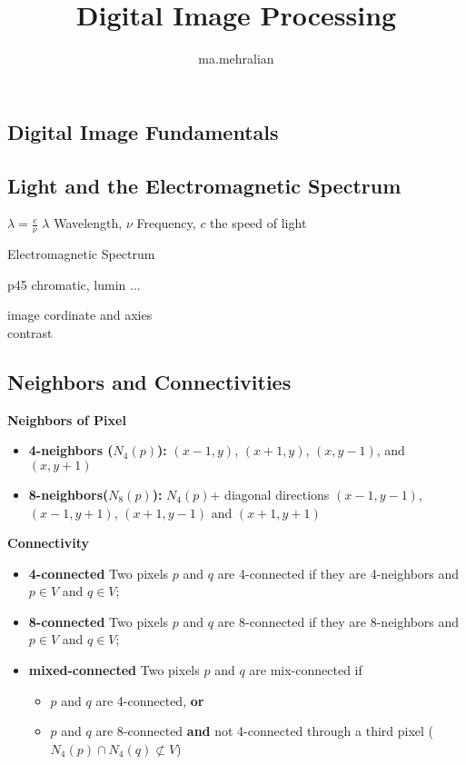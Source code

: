 \documentclass{../cheat}
\title{Digital Image Processing}
\author{ma.mehralian}
\begin{document}
\begin{multicols}{3}
	\section{Digital Image Fundamentals}
	\subsection{Light and the Electromagnetic Spectrum}
	$\lambda=\frac{c}{\nu}$
	$\lambda$ Wavelength, $\nu$ Frequency, $c$ the speed of light
	
	Electromagnetic Spectrum
	
	p45 chromatic, lumin ...
	
	image cordinate and axies\\
	
	contrast
	\subsection{Neighbors and Connectivities}
	\textbf{Neighbors of Pixel}
	\begin{itemize}[nolistsep, leftmargin=1em]
		\item \textbf{4-neighbors ($N_4(p)$):} $(x-1,y)$, $(x+1,y)$, $(x,y-1)$, and $(x,y+1)$
		\item \textbf{8-neighbors($N_8(p)$):} $N_4(p)$+ diagonal directions $(x-1,y-1)$, $(x-1,y+1)$, $(x+1,y-1)$ and $(x+1,y+1)$
	\end{itemize}
	\textbf{Connectivity}
	\begin{itemize}[nolistsep, leftmargin=1em]
		\item {\bf 4-connected} Two pixels $p$ and $q$ are 4-connected if they are 4-neighbors and
		$p \in V$ and $q \in V$;
		
		\item {\bf 8-connected}	Two pixels $p$ and $q$ are 8-connected if they are 8-neighbors and 
		$p \in V$ and $q \in V$;
		
		\item {\bf mixed-connected} Two pixels $p$ and $q$ are mix-connected if
		\begin{itemize}[nolistsep, leftmargin=1em]
			\item $p$ and $q$ are 4-connected, {\bf or}
			\item $p$ and $q$ are 8-connected {\bf and} not 4-connected through a third 
				pixel ($N_4(p) \cap N_4(q) \not\subset V$)
		\end{itemize}
	\end{itemize}
	

\end{multicols}
\end{document}

